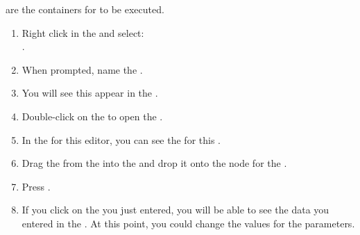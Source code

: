 \gdsuites{} are the containers for \gdcases{} to be executed. 
\begin{enumerate}
\item Right click in the \gdtestsuitebrowser{} and select:\\
. 
\item When prompted, name the \gdsuite{} .
\item You will see this \gdsuite{} appear in the \gdtestsuitebrowser{}.
\item Double-click on the \gdsuite{} to open the \gdtestsuiteeditor{}. 
\item In the \gdpropview{} for this editor, you can see the \gdaut{} for this \gdsuite{}. 
\item Drag the \gdcase{}  from the \gdtestcasebrowser{} into the \gdtestsuiteeditor{} and drop it onto the node for the  \gdsuite{}.
\item Press . 
\item If you click on the \gdcase{} you just entered, you will be able to see the data you entered in the \gddatasetsview{}. At this point, you could change the values for the parameters. 
\end{enumerate}

